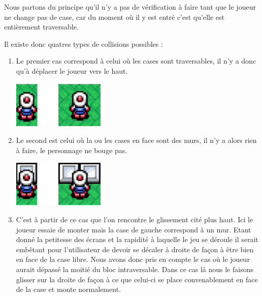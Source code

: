 \begin{enumerate}
				  		
				  		Nous partons du principe qu'il n'y a pas de vérification à faire tant
				  		que le joueur ne change pas de case, car du moment où il y est entré
				  		c'est qu'elle est entièrement traversable.
				  		
				  		Il existe donc quatres types de collisions possibles :
				  		
				  		\begin{enumerate}

				  		  \item Le premier cas correspond à celui où les cases sont
				  		  traversables, il n'y a donc qu'à déplacer le joueur vers le haut.

							\begin{center}						
								\includegraphics[width=168px,height=84px]{Developpement/Img/ok2.eps}
							\end{center}

				  		  \item Le second est celui où la ou les cases en face sont des murs, il
				  		  n'y a alors rien à faire, le personnage ne bouge pas.
				  		  				  		  
				  		  	\begin{center}						
								\includegraphics[width=168px,height=84px]{Developpement/Img/ko2.eps}
							\end{center}
							
				  		  \item C'est à partir de ce cas que l'on rencontre le glissement cité
				  		  plus haut.
				  		  Ici le joueur essaie de monter mais la case de gauche correspond à un
				  		  mur. Etant donné la petitesse des écrans et la rapidité à laquelle le
				  		  jeu se déroule il serait embêtant pour l'utilisateur de devoir se
				  		  décaler à droite de façon à être bien en face de la case libre.
				  		  Nous avons donc pris en compte le cas où le joueur aurait dépassé la
				  		  moitié du bloc intraversable. Dans ce cas là nous le faisons glisser
				  		  sur la droite de façon à ce que celui-ci se place convenablement en
				  		  face de la case et monte normalement.
				  		  

\end{enumerate}
\end{enumerate}
